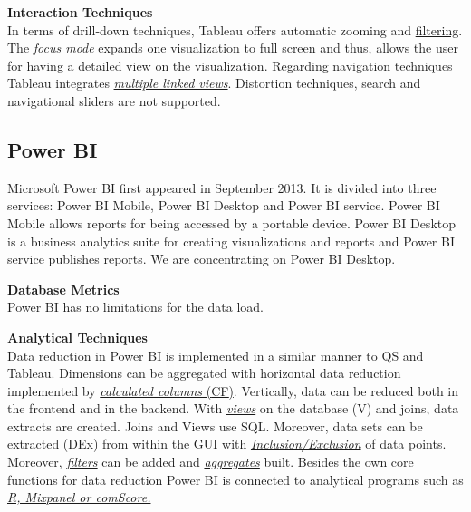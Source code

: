 \textbf{Interaction Techniques}\\
In terms of drill-down techniques, Tableau offers automatic zooming and  \hyperlink{http://kb.tableau.com/articles/howto/adding-filters-to-dashboards}{filtering}. The \textit{focus mode} expands one visualization to full screen and thus, allows the user for having a detailed view on the visualization. 
Regarding navigation techniques Tableau integrates \href{https://www.tableau.com/de-de/whitepapers/enhancing-visual-analysis-linking-multiple-views-data}{\textit{multiple linked views}}.
Distortion techniques, search and navigational sliders are not supported. 
\par
\pagebreak
\subsection{Power BI}\label{tool:PowerBI}
Microsoft Power BI first appeared in September 2013. It is divided into three services: Power BI Mobile, Power BI Desktop and Power BI service. Power BI Mobile allows reports for being accessed by a portable device. Power BI Desktop is a business analytics suite for creating visualizations and reports and Power BI service publishes reports. We are concentrating on Power BI Desktop.
\par
\textbf{Database Metrics}\\
Power BI has no limitations for the data load.
\par
\textbf{Analytical Techniques}\\
Data reduction in Power BI is implemented in a similar manner to \gls{QS}   and Tableau. Dimensions can be aggregated with 
horizontal data reduction implemented by  \href{https://powerbi.microsoft.com/en-us/documentation/powerbi-desktop-tutorial-create-calculated-columns/}{\textit{calculated columns} (\gls{CF})}. Vertically, data can be reduced both in the frontend and in the backend. With \href{https://community.powerbi.com/t5/Desktop/How-to-reduce-the-amount-of-data-that-is-loaded-into-my-Power-BI/td-p/54112}{\textit{views}} on the database  (V) and joins, data extracts are created. Joins and Views use SQL. Moreover, data sets can be extracted  (\gls{DEx}) from within the \gls{GUI} with \href{https://Power BI.microsoft.com/de-de/blog/power-bi-desktop-october-feature-summary/#grouping}{\textit{Inclusion/Exclusion}} of data points. Moreover, \href{https://powerbi.microsoft.com/en-us/documentation/powerbi-service-add-a-filter-to-a-report/}{\textit{filters}} can be added and  \href{https://powerbi.microsoft.com/en-us/documentation/powerbi-service-aggregates/}{\textit{aggregates}} built.
Besides the own core functions for data reduction Power BI is connected to analytical programs such as \href{https://Power BI.microsoft.com/de-de/blog/power-bi-desktop-october-feature-summary/#grouping}{\textit{R, Mixpanel or comScore.}}
\par


